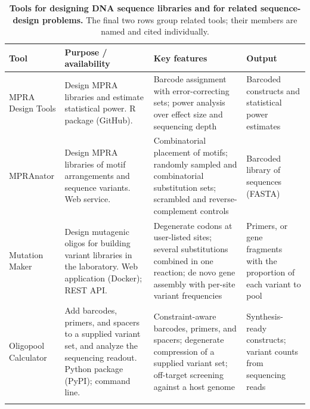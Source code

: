 \begin{table}[tbp]
\centering
\scriptsize
\setlength{\tabcolsep}{3pt}
\renewcommand{\arraystretch}{0.9}
\caption{\textbf{Tools for designing DNA sequence libraries and for related sequence-design problems.} The final two rows group related tools; their members are named and cited individually.}
\label{tab:tools}
\begin{tabular}{@{}>{\raggedright\arraybackslash}p{2.0cm}>{\raggedright\arraybackslash}p{3.4cm}>{\raggedright\arraybackslash}p{4.3cm}>{\raggedright\arraybackslash}p{2.15cm}@{}}
\toprule
\textbf{Tool} & \textbf{Purpose / availability} & \textbf{Key features} &
\textbf{Output}\\
\midrule

MPRA Design Tools \citep{Ghazi2018aa} &
Design MPRA libraries and estimate statistical power. R package (GitHub). &
Barcode assignment with error-correcting sets; power analysis over effect size and sequencing depth &
Barcoded constructs and statistical power estimates\\
\addlinespace

MPRAnator \citep{GeorgakopoulosSoares2017gb} &
Design MPRA libraries of motif arrangements and sequence variants. Web service. &
Combinatorial placement of motifs; randomly sampled and combinatorial substitution sets; scrambled and reverse-complement controls &
Barcoded library of sequences (FASTA)\\
\addlinespace

Mutation Maker \citep{Hiraga2021yg} &
Design mutagenic oligos for building variant libraries in the laboratory. Web application (Docker); REST API. &
Degenerate codons at user-listed sites; several substitutions combined in one reaction; de novo gene assembly with per-site variant frequencies &
Primers, or gene fragments with the proportion of each variant to pool\\
\addlinespace

Oligopool Calculator \citep{Hossain2024oc} &
Add barcodes, primers, and spacers to a supplied variant set, and analyze the sequencing readout. Python package (PyPI); command line. &
Constraint-aware barcodes, primers, and spacers; degenerate compression of a supplied variant set; off-target screening against a host genome &
Synthesis-ready constructs; variant counts from sequencing reads\\
\addlinespace


\end{tabular}
\end{table}
